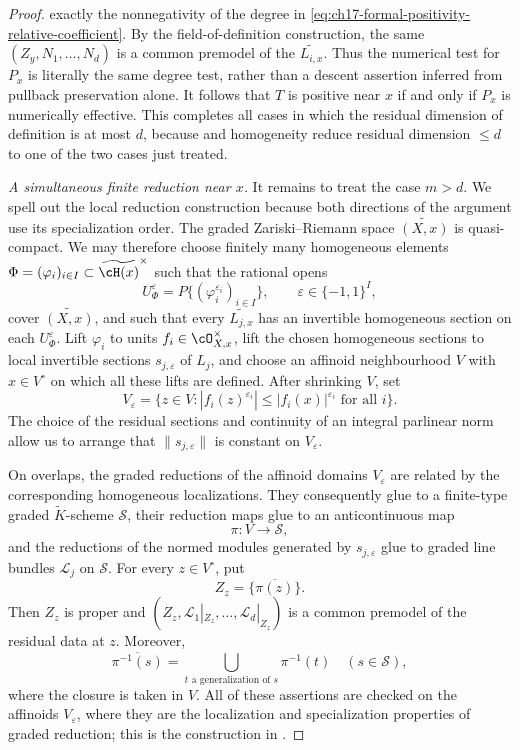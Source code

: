 \begin{proof}
exactly the nonnegativity of the degree in
\eqref{eq:ch17-formal-positivity-relative-coefficient}.  By the
field-of-definition construction, the same
$(Z_y,N_1,\ldots,N_d)$ is a common premodel of the
$\widetilde{L_{i,x}}$.  Thus the numerical test for $P_x$ is literally
the same degree test, rather than a descent assertion inferred from
pullback preservation alone.  It follows that $T$ is positive near
$x$ if and only if $P_x$ is numerically effective.  This completes all
cases in which the residual dimension of definition is at most $d$,
because \cite[Proposition~17.6.4]{CLD25} and homogeneity reduce residual
dimension $\leq d$ to one of the two cases just treated.

\emph{A simultaneous finite reduction near $x$.}
It remains to treat the case $m>d$.  We spell out the local reduction
construction because both directions of the argument use its
specialization order.  The graded Zariski--Riemann space
$\widetilde{(X,x)}$ is quasi-compact.  We may therefore choose finitely
many homogeneous elements
$\Phi=(\varphi_i)_{i\in I}\subset\widetilde{\cH(x)}^\times$ such that the
rational opens
\[
 U_\Phi^\varepsilon
 =P\{(\varphi_i^{\varepsilon_i})_{i\in I}\},
 \qquad \varepsilon\in\{-1,1\}^I,
\]
cover $\widetilde{(X,x)}$, and such that every
$\widetilde{L_{j,x}}$ has an invertible homogeneous section on each
$U_\Phi^\varepsilon$.  Lift $\varphi_i$ to units
$f_i\in\cO_{X,x}^\times$, lift the chosen homogeneous sections to local
invertible sections $s_{j,\varepsilon}$ of $L_j$, and choose an
affinoid neighbourhood $V$ with $x\in V^\circ$ on which all these
lifts are defined.  After shrinking $V$, set
\[
 V_\varepsilon
 =\{z\in V:|f_i(z)^{\varepsilon_i}|
                    \leq |f_i(x)|^{\varepsilon_i}\text{ for all }i\}.
\]
The choice of the residual sections and continuity of an integral
parlinear norm allow us to arrange that
$\|s_{j,\varepsilon}\|$ is constant on $V_\varepsilon$.

On overlaps, the graded reductions of the affinoid domains
$V_\varepsilon$ are related by the corresponding homogeneous
localizations.  They consequently glue to a finite-type graded
$\widetilde K$-scheme $\mathscr S$, their reduction maps glue to an
anticontinuous map
\[
                         \pi:V\longrightarrow\mathscr S,
\]
and the reductions of the normed modules generated by
$s_{j,\varepsilon}$ glue to graded line bundles $\mathscr L_j$ on
$\mathscr S$.  For every $z\in V^\circ$, put
\[
                         Z_z=\overline{\{\pi(z)\}}.
\]
Then $Z_z$ is proper and
$(Z_z,\mathscr L_1|_{Z_z},\ldots,\mathscr L_d|_{Z_z})$ is a common
premodel of the residual data at $z$.  Moreover,
\begin{equation}
 \overline{\pi^{-1}(s)}
 =\bigcup_{t\text{ a generalization of }s}\pi^{-1}(t)
 \quad(s\in\mathscr S),
 \label{eq:ch17-formal-positivity-fibre-closure}
\end{equation}
where the closure is taken in $V$.  All of these assertions are checked
on the affinoids $V_\varepsilon$, where they are the localization and
specialization properties of graded reduction; this is the construction in
\cite[proof of Theorem~18.8.4, pp.~539--540]{CLD25}.


\end{proof}
